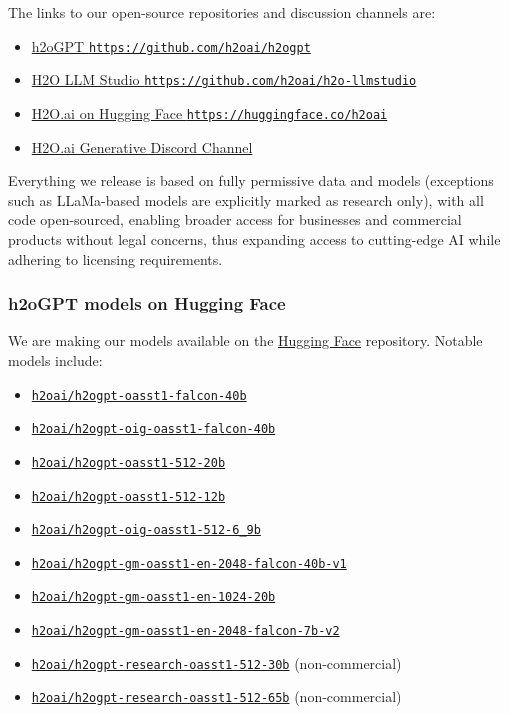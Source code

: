\documentclass{article}
\begin{document}
The links to our open-source repositories and discussion channels are:
\begin{itemize}
\item \href{https://github.com/h2oai/h2ogpt}{\faGithubSquare h2oGPT \texttt{https://github.com/h2oai/h2ogpt}}
\item \href{https://github.com/h2oai/h2o-llmstudio}{\faGithubSquare H2O LLM Studio \texttt{https://github.com/h2oai/h2o-llmstudio}}
\item \href{https://huggingface.co/h2oai}{H2O.ai on Hugging Face \texttt{https://huggingface.co/h2oai}}
\item \href{https://discord.com/channels/1097462770674438174/1100717863221870643}{H2O.ai Generative Discord Channel}
\end{itemize}

Everything we release is based on fully permissive data and models (exceptions such as LLaMa-based models are explicitly marked as research only), with all code open-sourced, enabling broader access for businesses and commercial products without legal concerns, thus expanding access to cutting-edge AI while adhering to licensing requirements.

\subsubsection{h2oGPT models on Hugging Face}
We are making our models available on the \href{https://huggingface.co/h2oai}{Hugging Face} repository.
Notable models include:
\begin{itemize}
    \item \href{https://huggingface.co/h2oai/h2ogpt-oasst1-falcon-40b}{\texttt{h2oai/h2ogpt-oasst1-falcon-40b}}
    \item \href{https://huggingface.co/h2oai/h2ogpt-oig-oasst1-falcon-40b}{\texttt{h2oai/h2ogpt-oig-oasst1-falcon-40b}}
    \item \href{https://huggingface.co/h2oai/h2ogpt-oasst1-512-20b}{\texttt{h2oai/h2ogpt-oasst1-512-20b}}
    \item \href{https://huggingface.co/h2oai/h2ogpt-oasst1-512-12b}{\texttt{h2oai/h2ogpt-oasst1-512-12b}}
    \item \href{https://huggingface.co/h2oai/h2ogpt-oig-oasst1-512-6_9b}{\texttt{h2oai/h2ogpt-oig-oasst1-512-6\_9b}}
    \item \href{https://huggingface.co/h2oai/h2ogpt-gm-oasst1-en-2048-falcon-40b-v1}{\texttt{h2oai/h2ogpt-gm-oasst1-en-2048-falcon-40b-v1}}
    \item \href{https://huggingface.co/h2oai/h2ogpt-gm-oasst1-en-1024-20b}{\texttt{h2oai/h2ogpt-gm-oasst1-en-1024-20b}}
    \item \href{https://huggingface.co/h2oai/h2ogpt-gm-oasst1-en-2048-falcon-7b-v2}{\texttt{h2oai/h2ogpt-gm-oasst1-en-2048-falcon-7b-v2}}
    \item \href{https://huggingface.co/h2oai/h2ogpt-research-oasst1-512-30b}{\texttt{h2oai/h2ogpt-research-oasst1-512-30b}} (non-commercial)
    \item \href{https://huggingface.co/h2oai/h2ogpt-research-oasst1-512-65b}{\texttt{h2oai/h2ogpt-research-oasst1-512-65b}} (non-commercial)
\end{itemize}
\end{document}
